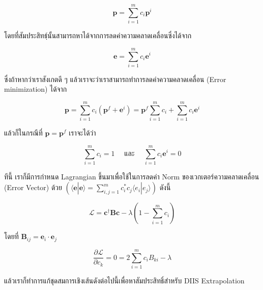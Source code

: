 \begin{equation}
  \mathbf{p}
  =
  \sum_{i=1}^{m} c_i \mathbf{p}^i
\end{equation}

\noindent โดยที่สัมประสิทธฺ์นั้นสามารถหาได้จากการลดค่าความคลาดเคลื่อนซึ่งได้จาก

\begin{equation}
  \mathbf{e}
  =
  \sum_{i=1}^{m} c_i \mathbf{e}^i
\end{equation}

\noindent ซึ่งถ้าหากว่าเราสังเกตดี ๆ แล้วเราจะว่าเราสามารถทำการลดค่าความคลาดเคลื่อน (Error minimization) ได้จาก

\begin{equation}
  \mathbf{p}
  =
  \sum_{i=1}^{m} c_i \left( \mathbf{p}^f + \mathbf{e}^i\right)
  =
  \mathbf{p}^f \sum_{i=1}^{m} c_i  + \sum_{i=1}^{m} c_i \mathbf{e}^i
\end{equation}

\noindent แล้วก็ในกรณีที่ $\mathbf{p} = \mathbf{p}^f$ เราจะได้ว่า

\begin{equation}
  \sum_{i=1}^{m} c_i = 1
  \quad
  \text{ และ }
  \quad
  \sum_{i=1}^{m} c_i \mathbf{e}^i = 0
\end{equation}

\noindent ทีนี้ เราก็มีการกำหนด Lagrangian ขึ้นมาเพื่อใช้ในการลดค่า Norm ของเวกเตอร์ความคลาดเคลื่อน (Error Vector) ด้วย
$(\langle \mathbf{e} | \mathbf{e} \rangle = \sum_{i,j = 1}^{m} c_i^* c_j \langle e_i | e_j \rangle)$ ดังนี้

\begin{equation}
  \mathcal{L}
  =
  \mathbf{c}^\dagger \mathbf{B} \mathbf{c} - \lambda \left( 1-\sum_{i=1}^m c_i \right)
\end{equation}

\noindent โดยที่ $\mathbf{B}_{ij} = \mathbf{e}_i \cdot \mathbf{e}_j$

\begin{equation}
  \frac{\partial\mathcal{L}}{\partial c_k}
  =
  0
  =
  2 \sum_{i=1}^m c_i B_{ki} -\lambda
\end{equation}

\noindent แล้วเราก็ทำการแก้ชุดสมการเชิงเส้นดังต่อไปนี้เพื่อหาสัมประสิทธิ์สำหรับ DIIS Extrapolation

